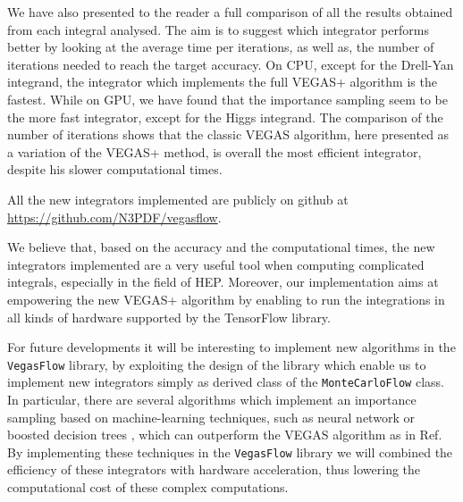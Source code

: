 \documentclass[../main/main.tex]{subfiles}
\begin{document}
We have also presented to the reader a full comparison of all the results obtained from each integral analysed. The aim is to suggest which integrator performs better by looking at the average time per iterations, as well as, the number of iterations needed to reach the target accuracy. On CPU, except for the Drell-Yan integrand, the integrator which implements the full VEGAS+ algorithm is the fastest. While on GPU, we have found that the importance sampling seem to be the more fast integrator, except for the Higgs integrand.
The comparison of the number of iterations shows that the classic VEGAS algorithm, here presented as a variation of the VEGAS+ method, is overall the most efficient 
integrator, despite his slower computational times. 

All the new integrators implemented are publicly on github at \url{https://github.com/N3PDF/vegasflow}.

We believe that, based on the accuracy and the computational times, the new integrators implemented are a very useful tool when computing complicated integrals, especially in the field of HEP. Moreover, our implementation aims at empowering the new VEGAS+ algorithm by enabling to run the integrations in all kinds of hardware supported by the TensorFlow library.

For future developments it will be interesting to implement new algorithms in the \texttt{VegasFlow} library, by exploiting the design of the library which enable us to implement new integrators simply as derived class of the \texttt{MonteCarloFlow} class. In particular, there are several algorithms which implement an importance sampling based on machine-learning techniques, such as neural network or boosted decision trees \cite{Bendavid:2017zhk}, which can outperform the VEGAS algorithm as in Ref\cite{Gao:2020vdv}. 
By implementing these techniques in the \texttt{VegasFlow} library we will combined the efficiency of these integrators with hardware acceleration, thus lowering the computational cost of these complex computations.
\end{document}
